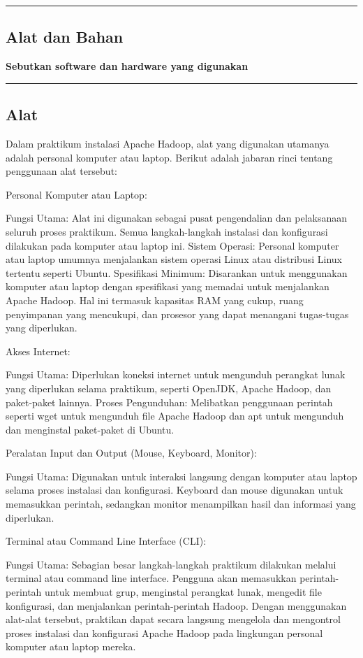 {\color{gray}\hrule}
\begin{center}
\section{Alat dan Bahan}
\textbf{Sebutkan software dan hardware yang digunakan}
\end{center}
{\color{gray}\hrule}
\begin{multicols}{2}
\subsection{Alat}
Dalam praktikum instalasi Apache Hadoop, alat yang digunakan utamanya adalah personal komputer atau laptop. Berikut adalah jabaran rinci tentang penggunaan alat tersebut:

Personal Komputer atau Laptop:

Fungsi Utama: Alat ini digunakan sebagai pusat pengendalian dan pelaksanaan seluruh proses praktikum. Semua langkah-langkah instalasi dan konfigurasi dilakukan pada komputer atau laptop ini.
Sistem Operasi: Personal komputer atau laptop umumnya menjalankan sistem operasi Linux atau distribusi Linux tertentu seperti Ubuntu.
Spesifikasi Minimum: Disarankan untuk menggunakan komputer atau laptop dengan spesifikasi yang memadai untuk menjalankan Apache Hadoop. Hal ini termasuk kapasitas RAM yang cukup, ruang penyimpanan yang mencukupi, dan prosesor yang dapat menangani tugas-tugas yang diperlukan.

Akses Internet:

Fungsi Utama: Diperlukan koneksi internet untuk mengunduh perangkat lunak yang diperlukan selama praktikum, seperti OpenJDK, Apache Hadoop, dan paket-paket lainnya.
Proses Pengunduhan: Melibatkan penggunaan perintah seperti wget untuk mengunduh file Apache Hadoop dan apt untuk mengunduh dan menginstal paket-paket di Ubuntu.

Peralatan Input dan Output (Mouse, Keyboard, Monitor):

Fungsi Utama: Digunakan untuk interaksi langsung dengan komputer atau laptop selama proses instalasi dan konfigurasi. Keyboard dan mouse digunakan untuk memasukkan perintah, sedangkan monitor menampilkan hasil dan informasi yang diperlukan.

Terminal atau Command Line Interface (CLI):

Fungsi Utama: Sebagian besar langkah-langkah praktikum dilakukan melalui terminal atau command line interface. Pengguna akan memasukkan perintah-perintah untuk membuat grup, menginstal perangkat lunak, mengedit file konfigurasi, dan menjalankan perintah-perintah Hadoop.
Dengan menggunakan alat-alat tersebut, praktikan dapat secara langsung mengelola dan mengontrol proses instalasi dan konfigurasi Apache Hadoop pada lingkungan personal komputer atau laptop mereka.

\end{multicols}
